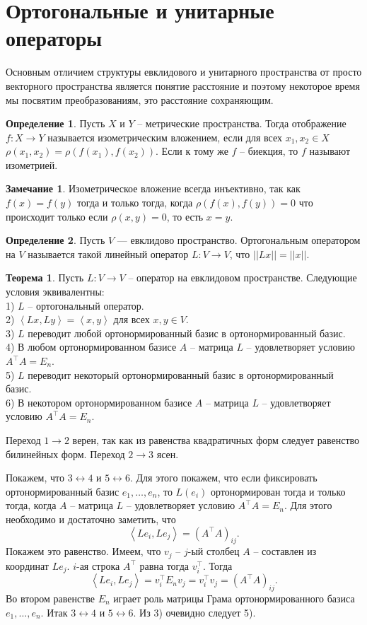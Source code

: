\documentclass[10pt,a4paper,oneside]{book} %
\theoremstyle{definition}
\newtheorem*{rem}{Замечание}
\newtheorem*{defn}{Определение}
\newtheorem{thm}{Теорема}
\def\lan{\left\langle }
\def\ran{\right\rangle}
\def\thrm{\begin{thm}}
\def\ethrm{\end{thm}}
\def\dfn{\begin{defn}}
\def\edfn{\end{defn}}
\def\rm{\begin{rem}}
\def\erm{\end{rem}}
\begin{document}
\section{Ортогональные и унитарные операторы}

Основным отличием структуры евклидового и унитарного пространства от просто векторного пространства является понятие расстояние и поэтому некоторое время мы посвятим преобразованиям, это расстояние сохраняющим.

\dfn Пусть $X$ и $Y$ -- метрические пространства. Тогда отображение $f\colon X \to Y$ называется изометрическим вложением, если для всех $x_1,x_2 \in X$ $\rho(x_1,x_2)=\rho(f(x_1),f(x_2))$. Если к тому же $f$ -- биекция, то $f$ называют изометрией.
\edfn

\rm Изометрическое вложение всегда инъективно, так как $f(x)=f(y)$ тогда и только тогда, когда $\rho(f(x),f(y))=0$ что происходит только если $\rho(x,y)=0$, то есть $x=y$.
\erm


\dfn Пусть $V$ --- евклидово пространство. Ортогональным оператором на $V$ называется такой линейный оператор $L \colon V \to V$, что $||Lx||=
||x||$.
\edfn

\thrm Пусть $L\colon V \to V$ -- оператор на евклидовом пространстве. Следующие условия эквивалентны:\\
1) $L$ -- ортогональный оператор.\\
2) $\lan Lx,Ly\ran=\lan x,y \ran$ для всех $x,y \in V$.\\
3) $L$ переводит любой ортонормированный базис в ортонормированный базис.\\
4) В любом ортонормированном базисе $A$ -- матрица $L$ -- удовлетворяет условию $A^{\top} A = E_n$.\\
5) $L$ переводит некоторый ортонормированный базис в ортонормированный базис.\\
6) В некотором ортонормированном базисе $A$ -- матрица $L$ --  удовлетворяет условию $A^{\top} A = E_n$.
\ethrm
\proof
Переход $1\to 2$ верен, так как из равенства квадратичных форм следует равенство билинейных форм. Переход $2\to 3$ ясен.


Покажем, что $3 \leftrightarrow 4$ и $5 \leftrightarrow 6$. Для этого покажем, что если фиксировать ортонормированный базис $e_1,\dots, e_n$, то $L(e_i)$ ортонормирован тогда и только тогда, когда $A$ -- матрица $L$ -- удовлетворяет условию $A^{\top}A=E_n$. Для этого необходимо и достаточно заметить, что $$\lan Le_i, Le_j \ran = (A^{\top}A)_{ij}.$$
Покажем это равенство. Имеем, что $v_j$ -- $j$-ый столбец $A$ -- составлен из координат $Le_j$. $i$-ая строка $A^{\top}$ равна тогда $v_i^{\top}$. Тогда $$\lan Le_i,Le_j\ran = v_i^{\top}E_n v_j= v_i^{\top}v_j= (A^{\top}A)_{ij}.$$
Во втором равенстве $E_n$ играет роль матрицы Грама ортонормированного базиса $e_1,\dots, e_n$.
Итак $3 \leftrightarrow 4$ и $5 \leftrightarrow 6$. Из 3) очевидно следует 5).
\end{document}
